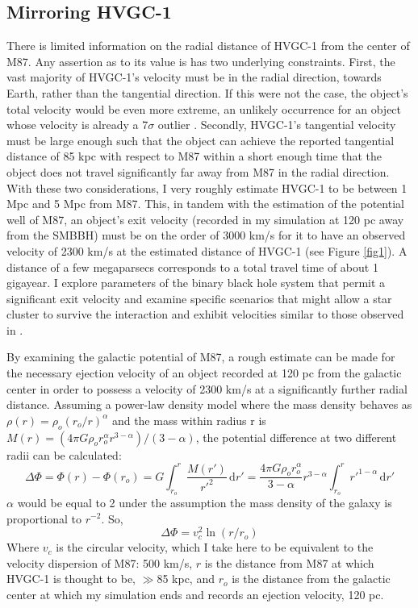 \documentclass{aastex62}
\begin{document}
\subsection{Mirroring HVGC-1}
There is limited information on the radial distance of HVGC-1 from the center of M87. Any assertion as to its value is has two underlying constraints. First, the vast majority of HVGC-1's velocity must be in the radial direction, towards Earth, rather than the tangential direction. If this were not the case, the object's total  velocity would be even more extreme, an unlikely occurrence for an object whose velocity is already a 7$\sigma$ outlier  \citep{cald14}. Secondly, HVGC-1's tangential velocity must be large enough such that the object can achieve the reported tangential distance of 85 kpc with respect to M87 within a short enough time that the object does not travel significantly far away from M87 in the radial direction. With these two considerations, I very roughly estimate HVGC-1 to be between 1 Mpc and 5 Mpc from M87. This, in tandem with the estimation of the potential well of M87, an object's exit velocity (recorded in my simulation at 120 pc away from the SMBBH) must be on the order of 3000 km/s for it to have an observed velocity of 2300 km/s at the estimated distance of HVGC-1 (see Figure \ref{fig1}). A distance of a few megaparsecs corresponds to a total travel time of about 1 gigayear. I explore parameters of the binary black hole system that permit a significant exit velocity and examine specific scenarios that might allow a star cluster to survive the interaction and exhibit velocities similar to those observed in \citet{cald14}.

By examining the galactic potential of M87, a rough estimate can be made for the necessary ejection velocity of an object recorded at 120 pc from the galactic center in order to possess a velocity of 2300 km/s at a significantly further radial distance. Assuming a power-law density model where the mass density behaves as $\rho(r) = \rho_{o}(r_{o}/r)^\alpha$ and the mass within radius r is $M(r) = (4\pi G\rho_{o}r_{o}^\alpha r^{3-\alpha})/(3-\alpha)$, the potential difference at two different radii can be calculated:
\begin{equation}
\Delta\Phi = \Phi(r) - \Phi(r_{o}) = G\int_{r_{o}}^{r} \! \frac{M(r')}{r'^2} \, \mathrm{d}r' = \frac{4\pi G\rho_{o}r_{o}^\alpha }{3-\alpha} r^{3-\alpha}\int_{r_{o}}^{r} \! r'^{1-\alpha} \, \mathrm{d}r'
\end{equation}
 $\alpha$ would be equal to 2 under the assumption the mass density of the galaxy is proportional to $r^{-2}$. So,
\begin{equation}
 \Delta\Phi= v_{c}^{2}\ln(r/r_{o})
\end{equation}
Where $v_{c}$ is the circular velocity, which I take here to be equivalent to the velocity dispersion of M87: 500 km/s, $r$ is the distance from M87 at which HVGC-1 is thought to be, $\gg$85 kpc, and $r_{o}$ is the distance from the galactic center at which my simulation ends and records an ejection velocity, 120 pc. 
\end{document}
